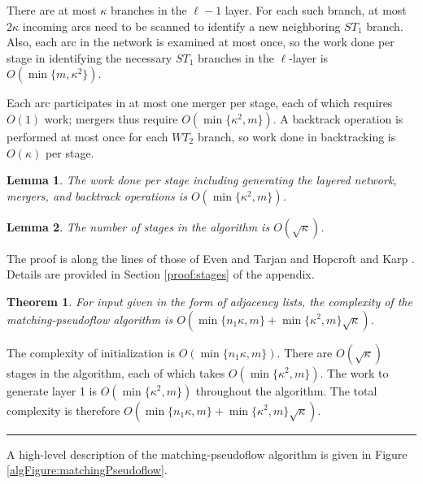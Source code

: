 \documentclass{article}
\newtheorem{theorem}{Theorem}[section]
\newtheorem{lemma}{Lemma}[section]
\newenvironment{proof}[1][Proof:]{\begin{trivlist}
\item[\hskip \labelsep {\bfseries #1}]}{\end{trivlist}}
\newcommand{\qed}{\hfill \rule{2.5mm}{2.5mm}}
\begin{document}
There are at most $\kappa$ branches in the $\ell-1$ layer. For each such branch, at most $2 \kappa$ incoming arcs need to be scanned to identify a new neighboring $ST_1$ branch. Also, each arc in the network is examined at most once, so the work done per stage in identifying the necessary $ST_1$ branches in the $\ell$-layer is $O(\min\{m, \kappa^2\})$.

Each arc participates in at most one merger per stage, each of which requires $O(1)$ work; mergers thus require $O(\min\{\kappa^2, m\})$. A backtrack operation is performed at most once for each $WT_2$ branch, so work done in backtracking is $O(\kappa)$ per stage.

\begin{lemma}
The work done per stage including generating the layered network, mergers, and backtrack operations is $O(\min\{\kappa^2, m\})$.
\end{lemma}

\begin{lemma}
\label{lem:stages}
The number of stages in the algorithm is $O(\sqrt{\kappa})$.
\end{lemma}

The proof is along the lines of those of Even and Tarjan \cite{EveT75} and Hopcroft and Karp \cite{HopK73}.  Details are provided in Section \ref{proof:stages} of the appendix.

\begin{theorem}
For input given in the form of adjacency lists, the complexity of the {\sf matching-pseudoflow} algorithm is $O(\min\{n_1\kappa, m\} + \min\{\kappa^2,m\} \sqrt{\kappa})$.
\end{theorem}

\begin{proof}
The complexity of initialization is $O(\min\{n_1\kappa,m\})$. There are $O(\sqrt{\kappa})$ stages in the algorithm, each of which takes $O(\min\{\kappa^2, m\})$. The work to generate layer 1 is $O(\min\{\kappa^2,m\})$ throughout the algorithm. The total complexity is therefore $O(\min\{n_1\kappa, m\} + \min\{\kappa^2,m\} \sqrt{\kappa})$. \qed
\end{proof}

\noindent A high-level description of the {\sf matching-pseudoflow} algorithm is given in Figure \ref{algFigure:matchingPseudoflow}.
\end{document}
